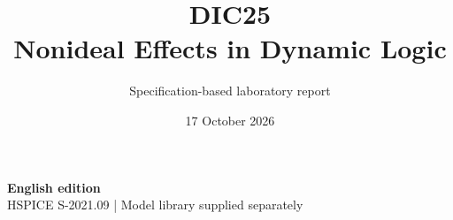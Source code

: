 \documentclass[11pt,a4paper]{article}
\title{\color{accent}DIC25\\[4pt]Nonideal Effects in Dynamic Logic}
\author{Specification-based laboratory report}
\date{17 October 2026}
\begin{document}
\maketitle
\begin{center}\small\textbf{English edition}\\
HSPICE S-2021.09 \quad | \quad Model library supplied separately
\end{center}


\end{document}
